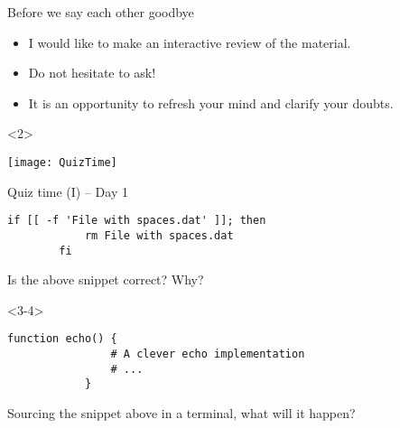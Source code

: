 
\begin{frame}{Before we say each other goodbye}
    \begin{itemize}
        \item I would like to make an interactive review of the material.
        \item Do not hesitate to ask!
        \item It is an opportunity to refresh your mind and clarify your doubts.
    \end{itemize}
    \vspace{5mm}
    \begin{uncoverenv}<2>
        \centerline{\texttt{[image: QuizTime]}}
    \end{uncoverenv}
\end{frame}
\begin{frame}[fragile]{Quiz time (I) -- Day 1}
    \vspace{-3mm}
    \begin{lstlisting}[style=myBash, numbers=none]
        if [[ -f 'File with spaces.dat' ]]; then
            rm File with spaces.dat
        fi
    \end{lstlisting}
    \begin{quiz}[1]{Is the above snippet correct? Why?}
    \end{quiz}
    \begin{uncoverenv}<3-4>
        \begin{lstlisting}[style=myBash, numbers=none]
            function echo() {
                # A clever echo implementation
                # ...
            }
        \end{lstlisting}
        \begin{quiz}[3]{Sourcing the snippet above in a terminal, what will it happen?}
        \end{quiz}
    \end{uncoverenv}
\end{frame}
